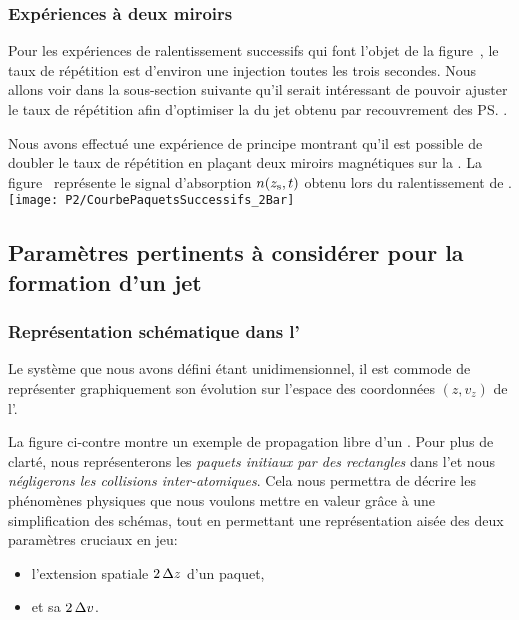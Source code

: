 \subsubsection{Expériences à deux miroirs}
Pour les expériences de ralentissement successifs qui font l'objet de la figure~, le taux de répétition est d'environ une injection toutes les trois secondes. Nous allons voir dans la sous-section suivante qu'il serait intéressant de pouvoir ajuster le taux de répétition afin d'optimiser la \dat du jet obtenu par recouvrement des \ps.

Nous avons effectué une expérience de principe montrant qu'il est possible de doubler le taux de répétition en plaçant deux miroirs magnétiques sur la \couconv. La figure~ représente le signal d'absorption $n({z_{\rm s}}, t)$ obtenu lors du ralentissement de \patss. 
\bfigss
\subfloat
{\label{fig:CourbePaquetsSuccessifs_2Bar}
\texttt{[image: P2/CourbePaquetsSuccessifs\_2Bar]}}
\label{fig:CourbePaquetsSuccessifs2Bar}
\efig


\casse


\subsection{Paramètres pertinents à considérer pour la formation d'un jet}\label{sec:MiroirParamPertinent}

\subsubsection{Représentation schématique dans l'\edpup}
Le système que nous avons défini étant unidimensionnel, il est commode de représenter graphiquement son évolution sur l'espace des coordonnées $(z,v_z)$ de l'\edpup. 

La figure ci-contre montre un exemple de propagation libre d'un \pat. Pour plus de clarté, nous représenterons les \emph{paquets initiaux par des rectangles} dans l'\edpup et nous \emph{négligerons les collisions inter-atomiques}. 
Cela nous permettra de décrire les phénomènes physiques que nous voulons mettre en valeur grâce à une simplification des schémas, tout en permettant une représentation aisée des deux paramètres cruciaux en jeu:
\begin{itemize}
	\item l'extension spatiale ${2\,\Delta {z}}$ d'un paquet,
	\item et sa \dispvitlong ${2\,\Delta {v}}$.
\end{itemize}

